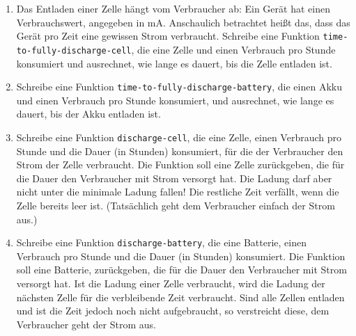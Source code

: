 \begin{aufgabe}
\begin{enumerate}
  \item Das Entladen einer Zelle hängt vom Verbraucher ab: Ein Gerät
    hat einen Verbrauchswert, angegeben in mA.  Anschaulich betrachtet
    heißt das, dass das Gerät pro Zeit eine gewissen Strom verbraucht.
    Schreibe eine Funktion \lstinline{time-to-fully-discharge-cell},
    die eine Zelle und einen Verbrauch pro Stunde konsumiert und
    ausrechnet, wie lange es dauert, bis die Zelle entladen ist.

  \item Schreibe eine Funktion
    \lstinline{time-to-fully-discharge-battery}, die einen Akku und einen
    Verbrauch pro Stunde konsumiert, und ausrechnet, wie lange es
    dauert, bis der Akku entladen ist.

  \item Schreibe eine Funktion \lstinline{discharge-cell}, die eine
    Zelle, einen Verbrauch pro Stunde und die Dauer (in Stunden)
    konsumiert, für die der Verbraucher den Strom der Zelle
    verbraucht.  Die Funktion soll eine Zelle zurückgeben, die für die
    Dauer den Verbraucher mit Strom versorgt hat.  Die Ladung darf
    aber nicht unter die minimale Ladung fallen! Die restliche Zeit
    verfällt, wenn die Zelle bereits leer ist. (Tatsächlich geht dem
    Verbraucher einfach der Strom aus.)

  \item Schreibe eine Funktion \lstinline{discharge-battery}, die
    eine Batterie, einen Verbrauch pro Stunde und die Dauer (in
    Stunden) konsumiert.  Die Funktion soll eine Batterie,
    zurückgeben, die für die Dauer den Verbraucher mit Strom versorgt
    hat.  Ist die Ladung einer Zelle verbraucht, wird die Ladung der
    nächsten Zelle für die verbleibende Zeit verbraucht.  Sind alle
    Zellen entladen und ist die Zeit jedoch noch nicht aufgebraucht,
    so verstreicht diese, dem Verbraucher geht der Strom aus.

  \end{enumerate}
  
\end{aufgabe}

